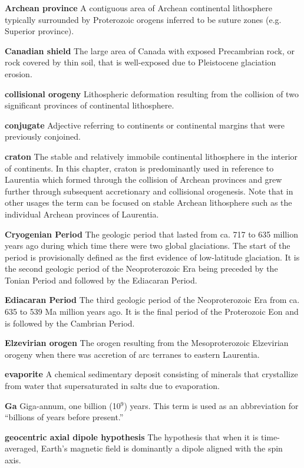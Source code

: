 \documentclass[twocolumn, switch]{article} %
\begin{document}
\noindent\textbf{Archean province } A contiguous area of Archean continental lithosphere typically surrounded by Proterozoic orogens inferred to be suture zones (e.g. Superior province).

\noindent\textbf{Canadian shield } The large area of Canada with exposed Precambrian rock, or rock covered by thin soil, that is well-exposed due to Pleistocene glaciation erosion.

\noindent\textbf{collisional orogeny } Lithospheric deformation resulting from the collision of two significant provinces of continental lithosphere.

\noindent\textbf{conjugate } Adjective referring to continents or continental margins that were previously conjoined.

\noindent\textbf{craton } The stable and relatively immobile continental lithosphere in the interior of continents. In this chapter, craton is predominantly used in reference to Laurentia which formed through the collision of Archean provinces and grew further through subsequent accretionary and collisional orogenesis. Note that in other usages the term can be focused on stable Archean lithosphere such as the individual Archean provinces of Laurentia.

\noindent\textbf{Cryogenian Period } The geologic period that lasted from ca. 717 to 635 million years ago during which time there were two global glaciations. The start of the period is provisionally defined as the first evidence of low-latitude glaciation. It is the second geologic period of the Neoproterozoic Era being preceded by the Tonian Period and followed by the Ediacaran Period.

\noindent\textbf{Ediacaran Period } The third geologic period of the Neoproterozoic Era from ca. 635 to 539 Ma million years ago. It is the final period of the Proterozoic Eon and is followed by the Cambrian Period.

\noindent\textbf{Elzevirian orogen } The orogen resulting from the Mesoproterozoic Elzevirian orogeny when there was accretion of arc terranes to eastern Laurentia.

\noindent\textbf{evaporite } A chemical sedimentary deposit consisting of minerals that crystallize from water that supersaturated in salts due to evaporation.

\noindent\textbf{Ga } Giga-annum, one billion (10$^9$) years. This term is used as an abbreviation for ``billions of years before present.''

\noindent\textbf{geocentric axial dipole hypothesis } The hypothesis that when it is time-averaged, Earth's magnetic field is dominantly a dipole aligned with the spin axis. 
\end{document}
